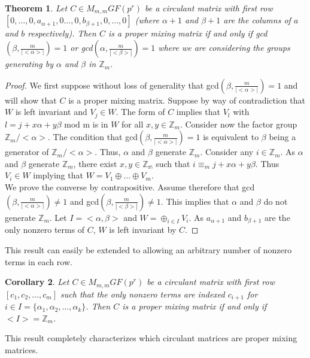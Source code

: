\documentclass[11pt]{amsart}
\newtheorem{theorem}{{\bf Theorem }}
\newtheorem{corollary}[theorem]{{\bf Corollary}}
\begin{document}
\begin{theorem}
Let $C \in M_{m,m} GF(p^r)$ be a circulant matrix with first row $[0,\dots,0,a_{\alpha + 1},0 \dots, 0, b_{\beta+1}, 0, \dots, 0]$ (where $\alpha + 1$ and $\beta + 1$ are the columns of $a$ and $b$ respectively). Then $C$ is a proper mixing matrix if and only if gcd$(\beta, \frac{m}{|<\alpha>|}) = 1$ or gcd$(\alpha, \frac{m}{|<\beta>|}) = 1$ where we are considering the groups generating by $\alpha$ and $\beta$ in $\mathbb{Z}_m$.
\end{theorem}
\begin{proof}
We first suppose without loss of generality that gcd$(\beta, \frac{m}{|<\alpha>|}) = 1$ and will show that $C$ is a proper mixing matrix. Suppose by way of contradiction that $W$ is left invariant and $V_j \in W$. The form of $C$ implies that $V_l$ with $l = j + x\alpha + y\beta \text{ mod m}$ is in $W$ for all $x,y \in \mathbb{Z}_m$. Consider now the factor group $\mathbb{Z}_m / <\alpha>$. The condition that gcd$(\beta, \frac{m}{|<\alpha>|}) = 1$ is equivalent to $\beta$ being a generator of $\mathbb{Z}_m / <\alpha>$. Thus, $\alpha$ and $\beta$ generate $\mathbb{Z}_m$. Consider any $i \in \mathbb{Z}_m$. As $\alpha$ and $\beta$ generate $\mathbb{Z}_m$, there exist $x,y \in \mathbb{Z_m}$ such that $i \equiv_m j + x\alpha + y\beta$. Thus $V_i \in W$ implying that $W = V_1 \oplus \dots \oplus V_m$. \\

We prove the converse by contrapositive. Assume therefore that gcd$(\beta, \frac{m}{|<\alpha>|}) \neq 1$ and gcd$(\beta, \frac{m}{|<\beta>|}) \neq 1$. This implies that $\alpha$ and $\beta$ do not generate $\mathbb{Z}_m$. Let $I = <\alpha, \beta>$ and $W = \oplus_{i \in I} V_i$. As $a_{\alpha + 1}$ and $b_{\beta + 1}$ are the only nonzero terms of $C$, $W$ is left invariant by $C$.
\end{proof}

This result can easily be extended to allowing an arbitrary number of nonzero terms in each row.

\begin{corollary}
Let $C \in M_{m,m} GF(p^r)$ be a circulant matrix with first row $[c_1, c_2, \dots, c_m]$ such that the only nonzero terms are indexed $c_{i+1}$ for $i \in I = \{\alpha_1, \alpha_2, \dots, \alpha_k\}$. Then $C$ is a proper mixing matrix if and only if $<I> = \mathbb{Z}_m$.
\end{corollary}
This result completely characterizes which circulant matrices are proper mixing matrices.
\end{document}
